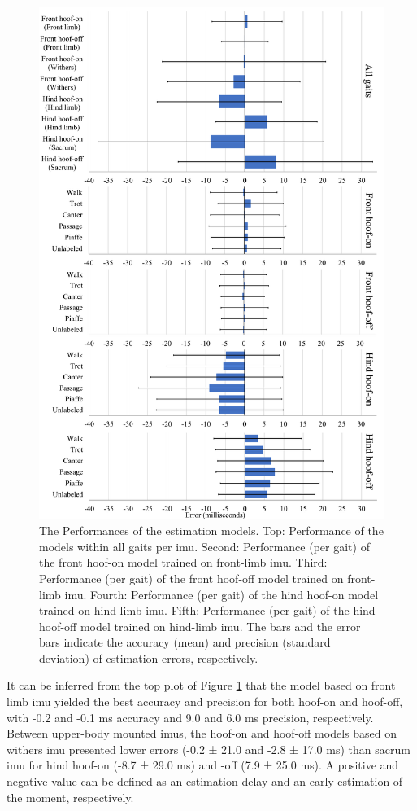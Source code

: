 \begin{figure}[htbp]
\centering
\includegraphics[width=.88\linewidth]{chapters/Step/figures/model_performances_step.png}
\caption{The Performances of the estimation models. Top: Performance of the models within all gaits per \gls{imu}. Second: Performance (per gait) of the front hoof-on model trained on front-limb \gls{imu}. Third: Performance (per gait) of the front hoof-off model trained on front-limb \gls{imu}. Fourth: Performance (per gait) of the hind hoof-on model trained on hind-limb \gls{imu}. Fifth: Performance (per gait) of the hind hoof-off model trained on hind-limb \gls{imu}. The bars and the error bars indicate the accuracy (mean) and precision (standard deviation) of estimation errors, respectively.}
\label{models_result_fig}
\end{figure}


It can be inferred from the top plot of Figure \ref{models_result_fig} that the model based on front limb \gls{imu} yielded the best accuracy and precision for both hoof-on and hoof-off, with -0.2 and -0.1 ms accuracy and 9.0 and 6.0 ms precision, respectively. Between upper-body mounted \gls{imu}s, the hoof-on and hoof-off models based on withers \gls{imu} presented lower errors (-0.2 ± 21.0 and -2.8 ± 17.0 ms) than sacrum \gls{imu} for hind hoof-on (-8.7 ± 29.0 ms) and -off (7.9 ± 25.0 ms). A positive and negative value can be defined as an estimation delay and an early estimation of the moment, respectively.

